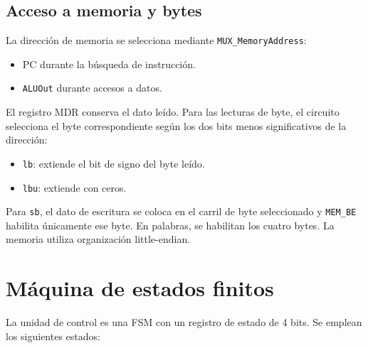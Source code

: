 \documentclass[11pt,a4paper]{article}
\begin{document}
\subsection{Acceso a memoria y bytes}

La dirección de memoria se selecciona mediante \texttt{MUX\_MemoryAddress}:
\begin{itemize}
    \item PC durante la búsqueda de instrucción.
    \item \texttt{ALUOut} durante accesos a datos.
\end{itemize}
El registro MDR conserva el dato leído. Para las lecturas de byte, el circuito selecciona el byte correspondiente según los dos bits menos significativos de la dirección:
\begin{itemize}
    \item \texttt{lb}: extiende el bit de signo del byte leído.
    \item \texttt{lbu}: extiende con ceros.
\end{itemize}
Para \texttt{sb}, el dato de escritura se coloca en el carril de byte seleccionado y \texttt{MEM\_BE} habilita únicamente ese byte. En palabras, se habilitan los cuatro bytes. La memoria utiliza organización little-endian.

\section{Máquina de estados finitos}
La unidad de control es una FSM con un registro de estado de 4 bits. Se emplean los siguientes estados:
\end{document}
